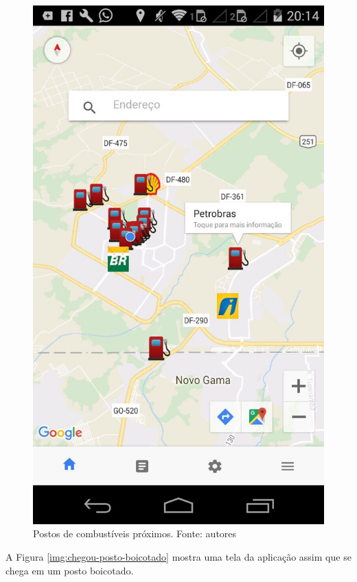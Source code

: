 \begin{figure}[H]
    \centering
    \includegraphics[scale=0.3]{figuras/app_2.jpg}
    \caption[Postos de combustíveis próximos]{Postos de combustíveis próximos. Fonte: autores}
    \label{img:postos_de_gasolina_proximos}
\end{figure}

A Figura \ref{img:chegou-posto-boicotado} mostra uma tela da aplicação assim que se chega em um posto boicotado.

